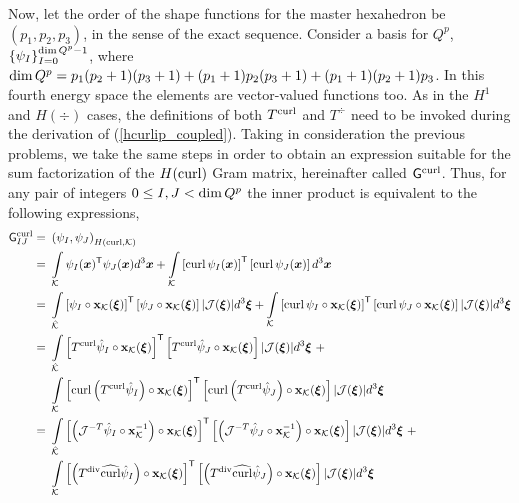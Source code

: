 Now, let the order of the shape functions for the master hexahedron be $(p_1,p_2,p_3)$, in the sense of the exact sequence. Consider a basis for $Q^p$, $\left\{ \psi_I \right\}_{I=0}^{\operatorname*{dim} Q^p-1}$, where $\operatorname*{dim} Q^p=p_1(p_2+1)(p_3+1)+(p_1+1)p_2(p_3+1)+(p_1+1)(p_2+1)p_3$. In this fourth energy space the elements are vector-valued functions too. As in the $H^1$ and $H(\div)$ cases, the definitions of both $T^{\operatorname{curl}}$ and $T^{\div}$ need to be invoked during the derivation of (\ref{hcurlip_coupled}). Taking in consideration the previous problems, we take the same steps in order to obtain an expression suitable for the sum factorization of the $H(\operatorname{curl})$ Gram matrix, hereinafter called $\mathsf{G}^{\operatorname{curl}}$. Thus, for any pair of integers $0\leq I,J<\operatorname*{dim} Q^p$ the inner product is equivalent to the following expressions,
%
\begin{align}
\sfG^{\curl}_{IJ}  =\ &\left( \psi_I, \psi_J\right)_{\HSo(\curl,\mcK)} \nonumber\\
                \ =\ & \int\limits_{\mcK} \psi_I(\bsx)^\T \psi_J(\bsx)d^3\bsx + \int\limits_{\mcK}\left[\curl \psi_I(\bsx)\right]^\T\left[\curl \psi_J(\bsx)\right]d^3\bsx \nonumber\\ 
                \ =\ & \int\limits_{\hatK}\left[ \psi_I\circ\bfx_\mcK(\bsxi)\right]^\T\left[ \psi_J\circ\bfx_\mcK(\bsxi)\right]|\mcJ(\bsxi)|d^3\bsxi +
                \int\limits_{\mcK}\left[\curl \psi_I\circ\bfx_\mcK(\bsxi)\right]^\T\left[\curl \psi_J\circ\bfx_\mcK(\bsxi)\right]|\mcJ(\bsxi)|d^3\bsxi \nonumber\\ 
                \ =\ & \int\limits_{\hatK}
                \left[ T^{\curl}\hat{ \psi}_I\circ\bfx_\mcK(\bsxi)\right]^\T\left[ T^{\curl}\hat{ \psi}_J\circ\bfx_\mcK(\bsxi)\right]|\mcJ(\bsxi)|d^3\bsxi \ +\nonumber\\*
                \ & \int\limits_{\mcK}
                \left[\curl\left( T^{\curl}\hat{ \psi}_I\right)\circ\bfx_\mcK(\bsxi)\right]^\T\left[\curl \left( T^{\curl}\hat{ \psi}_J\right)\circ\bfx_\mcK(\bsxi)\right]|\mcJ(\bsxi)|d^3\bsxi \nonumber\\ 
                =\ & \int\limits_{\hatK}
                \left[\left(\mcJ^{-T}\hat{ \psi}_I\circ\bfx_\mcK^{-1}\right)\circ\bfx_\mcK(\bsxi)\right]^\T \left[\left(\mcJ^{-T}\hat{ \psi}_J\circ\bfx_\mcK^{-1}\right)\circ\bfx_\mcK(\bsxi)\right]|\mcJ(\bsxi)|d^3\bsxi \ +\nonumber\\*
                \ & \int\limits_{\mcK}
                \left[\left(T^{\div}\widehat{\curl}\hat{ \psi}_I\right)\circ\bfx_\mcK(\bsxi)\right]^\T \left[\left(T^{\div}\widehat{\curl}\hat{ \psi}_J\right)\circ\bfx_\mcK(\bsxi)\right]|\mcJ(\bsxi)|d^3\bsxi \nonumber\\ 

\end{align}
